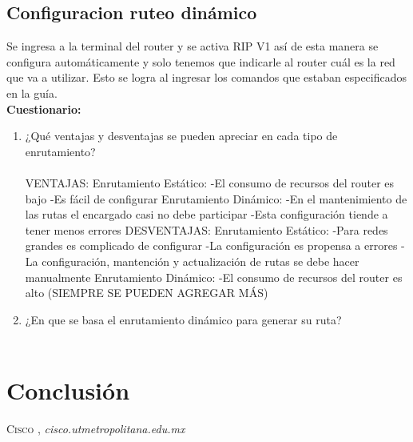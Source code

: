 \documentclass{udpreport}
\begin{document}
	\section{Configuracion ruteo dinámico}
	Se ingresa a la terminal del router y se activa RIP V1 así de esta manera se configura automáticamente y solo tenemos que
	indicarle al router cuál es la red que va a utilizar. Esto se logra al ingresar los comandos que estaban especificados en la
	guía.\\
{\large \bf{Cuestionario: }}\\
	\begin{enumerate}
	    \item ¿Qué ventajas y desventajas se pueden apreciar en cada tipo de enrutamiento?\\\\
	    VENTAJAS:
	    Enrutamiento Estático: -El consumo de recursos del router es bajo
	    			   -Es fácil de configurar
	    Enrutamiento Dinámico: -En el mantenimiento de las rutas el encargado casi no debe participar
	    			   -Esta configuración tiende a tener menos errores
	    DESVENTAJAS:
	    Enrutamiento Estático: -Para redes grandes es complicado de configurar
	    			   -La configuración es propensa a errores
	    			   -La configuración, mantención y actualización de rutas se debe hacer manualmente
	    Enrutamiento Dinámico: -El consumo de recursos del router es alto
	    (SIEMPRE SE PUEDEN AGREGAR MÁS)
            \item ¿En que se basa el enrutamiento dinámico para generar su ruta?\\\\
 
  	     
	\end{enumerate}
	
    
	
\chapter{Conclusión}
 
\begin{thebibliography}{x}
 \textsc{Cisco },
\textit{cisco.utmetropolitana.edu.mx}


\end{thebibliography}
\end{document}
